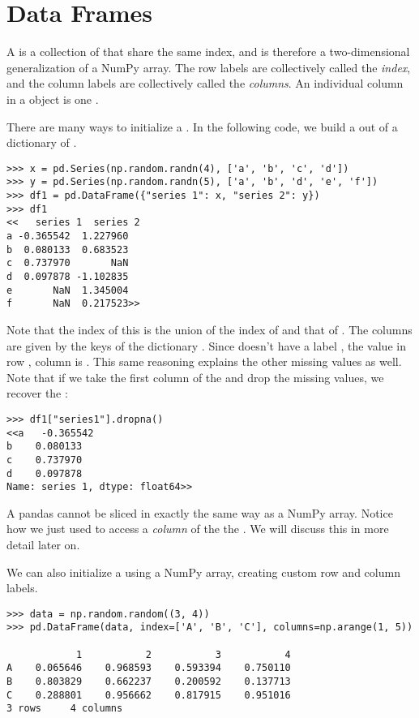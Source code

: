 \section*{Data Frames} %

A  is a collection of  that share the same index, and is therefore a two-dimensional generalization of a NumPy array.
The row labels are collectively called the \emph{index}, and the column labels are collectively called the \emph{columns}.
An individual column in a  object is one .

There are many ways to initialize a .
In the following code, we build a  out of a dictionary of .

\begin{lstlisting}
>>> x = pd.Series(np.random.randn(4), ['a', 'b', 'c', 'd'])
>>> y = pd.Series(np.random.randn(5), ['a', 'b', 'd', 'e', 'f'])
>>> df1 = pd.DataFrame({"series 1": x, "series 2": y})
>>> df1
<<   series 1  series 2
a -0.365542  1.227960
b  0.080133  0.683523
c  0.737970       NaN
d  0.097878 -1.102835
e       NaN  1.345004
f       NaN  0.217523>>
\end{lstlisting}

Note that the index of this  is the union of the index of   and that of  .
The columns are given by the keys of the dictionary .
Since  doesn't have a label , the
value in row , column  is .
This same reasoning explains the other missing values as well.
Note that if we take the first column of the  and drop the missing values, we recover the  :

\begin{lstlisting}
>>> df1["series1"].dropna()
<<a   -0.365542
b    0.080133
c    0.737970
d    0.097878
Name: series 1, dtype: float64>>
\end{lstlisting}

\begin{warn}
A pandas  cannot be sliced in exactly the same way as a NumPy array.
Notice how we just used  to access a \emph{column} of the
the  .
We will discuss this in more detail later on.
\end{warn}

We can also initialize a  using a NumPy array, creating custom
row and column labels.
\begin{lstlisting}
>>> data = np.random.random((3, 4))
>>> pd.DataFrame(data, index=['A', 'B', 'C'], columns=np.arange(1, 5))

            1	        2	        3	        4
A	 0.065646	 0.968593	 0.593394	 0.750110
B	 0.803829	 0.662237	 0.200592	 0.137713
C	 0.288801	 0.956662	 0.817915	 0.951016
3 rows     4 columns
\end{lstlisting}

